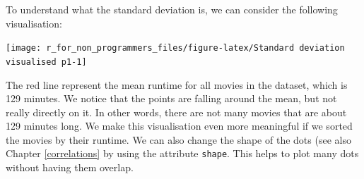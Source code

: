 \documentclass[
]{book}
\newenvironment{Shaded}{\begin{snugshade}}{\end{snugshade}}
\newcommand{\AttributeTok}[1]{\textcolor[rgb]{0.77,0.63,0.00}{#1}}
\newcommand{\CommentTok}[1]{\textcolor[rgb]{0.56,0.35,0.01}{\textit{#1}}}
\newcommand{\ConstantTok}[1]{\textcolor[rgb]{0.00,0.00,0.00}{#1}}
\newcommand{\FunctionTok}[1]{\textcolor[rgb]{0.00,0.00,0.00}{#1}}
\newcommand{\NormalTok}[1]{#1}
\newcommand{\OtherTok}[1]{\textcolor[rgb]{0.56,0.35,0.01}{#1}}
\newcommand{\SpecialCharTok}[1]{\textcolor[rgb]{0.00,0.00,0.00}{#1}}
\newcommand{\StringTok}[1]{\textcolor[rgb]{0.31,0.60,0.02}{#1}}
\begin{document}
To understand what the standard deviation is, we can consider the following visualisation:

\begin{Shaded}
\end{Shaded}

\begin{center}\texttt{[image: r\_for\_non\_programmers\_files/figure-latex/Standard deviation visualised p1-1]} \end{center}

The red line represent the mean runtime for all movies in the dataset, which is 129 minutes. We notice that the points are falling around the mean, but not really directly on it. In other words, there are not many movies that are about 129 minutes long. We make this visualisation even more meaningful if we sorted the movies by their runtime. We can also change the shape of the dots (see also Chapter \ref{correlations} by using the attribute \texttt{shape}. This helps to plot many dots without having them overlap.
\end{document}
